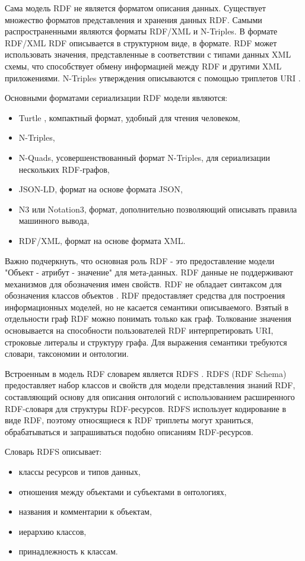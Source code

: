 Сама модель RDF не является форматом описания данных. Существует множество форматов представления и хранения данных RDF. Самыми распространенными являются форматы RDF/XML и N-Triples. В формате RDF/XML RDF описывается в структурном виде, в формате. RDF может использовать значения, представленные в соответствии с типами данных XML схемы, что способствует обмену информацией между RDF и другими XML приложениями. N-Triples утверждения описываются с помощью триплетов URI \cite{beckett2004rdf}. 

Основными форматами сериализации RDF модели являются:
\begin{itemize}
\item Turtle \cite{beckett2014rdf}, компактный формат, удобный для чтения человеком,
\item N-Triples,
\item N-Quads, усовершенствованный формат N-Triples, для сериализации нескольких RDF-графов,
\item JSON-LD, формат на основе формата JSON,
\item N3 или Notation3, формат,  дополнительно позволяющий описывать правила машинного вывода,
\item RDF/XML, формат на основе формата XML.
\end{itemize}

Важно подчеркнуть, что основная роль RDF - это предоставление модели "Объект - атрибут - значение" для мета-данных. RDF данные не поддерживают механизмов для обозначения имен свойств. RDF не обладает синтаксом для обозначения классов объектов \cite{decker2000semantic}. RDF предоставляет средства для построения информационных моделей, но не касается семантики описываемого. Взятый в отдельности граф RDF можно понимать только как граф. Толкование значения основывается на способности пользователей RDF интерпретировать URI, строковые литералы и структуру графа. Для выражения семантики требуются словари, таксономии и онтологии. 

Встроенным в модель RDF словарем является RDFS \cite{brickley2000resource}\cite{nejdl2000rdf}. RDFS (RDF Schema) предоставляет набор классов и свойств для модели представления знаний RDF, составляющий основу для описания онтологий с использованием расширенного RDF-словаря для структуры RDF-ресурсов. RDFS использует кодирование в виде RDF, поэтому относящиеся к RDF триплеты могут храниться, обрабатываться и запрашиваться подобно описаниям RDF-ресурсов. 

Словарь RDFS описывает:
\begin{itemize}
\item классы ресурсов и типов данных, 
\item отношения между объектами и субъектами в онтологиях,
\item названия и комментарии к объектам,
\item иерархию классов,
\item принадлежность к классам.
\end{itemize}


